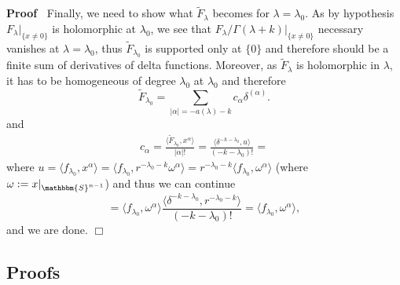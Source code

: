 \documentclass{article}
\newcommand{\assign}{:=}
\newenvironment{proof}{\noindent\textbf{Proof\ }}{\hspace*{\fill}$\Box$\medskip}
\numberwithin{definition}{section}
\numberwithin{lemma}{section}
\numberwithin{proposition}{section}
{\theorembodyfont{\rmfamily}\newtheorem{remark}{Remark}
\numberwithin{remark}{section}
}
\begin{document}
\begin{proof}
  Finally, we need to show what $\tilde{F}_{\lambda}$ becomes for $\lambda =
  \lambda_0$. As by hypothesis $F_{\lambda} |_{\{ x \neq 0 \}}$ is holomorphic
  at $\lambda_0$, we see that $F_{\lambda} / \Gamma ( \lambda + k) |_{\{ x
  \neq 0 \}}$ necessary vanishes at $\lambda = \lambda_0$, thus
  $\tilde{F}_{\lambda_0}$ is supported only at $\{ 0 \}$ and therefore should
  be a finite sum of derivatives of delta functions. Moreover, as
  $\tilde{F}_{\lambda}$ is holomorphic in $\lambda$, it has to be homogeneous
  of degree $\lambda_0$ at $\lambda_0$ and therefore
  \[ \tilde{F}_{\lambda_0} = \sum_{| \alpha | = - a ( \lambda) - k} c_{\alpha}
     \delta^{( \alpha)} . \]
  and
  \begin{eqnarray}
    & c_{\alpha} = \frac{\langle \tilde{F}_{\lambda_0}, x^{\alpha} \rangle}{|
    \alpha | !} = \frac{\langle \delta^{- k - \lambda_0}, u \rangle}{( - k -
    \lambda_0) !} = &  \nonumber
  \end{eqnarray}
  where $u = \langle f_{\lambda_0}, x^{\alpha} \rangle = \langle
  f_{\lambda_0}, r^{- \lambda_0 - k} \omega^{\alpha} \rangle = r^{- \lambda_0
  - k} \langle f_{\lambda_0}, \omega^{\alpha} \rangle$ (where $\omega \assign
  x |_{\mathbbm{S}^{n - 1}}$) and thus we can continue
  \[ = \langle f_{\lambda_0}, \omega^{\alpha} \rangle \frac{\langle \delta^{-
     k - \lambda_0}, r^{- \lambda_0 - k} \rangle}{( - k - \lambda_0) !} =
     \langle f_{\lambda_0}, \omega^{\alpha} \rangle, \]
  and we are done.
\end{proof}

\subsection{Proofs}
\end{document}
